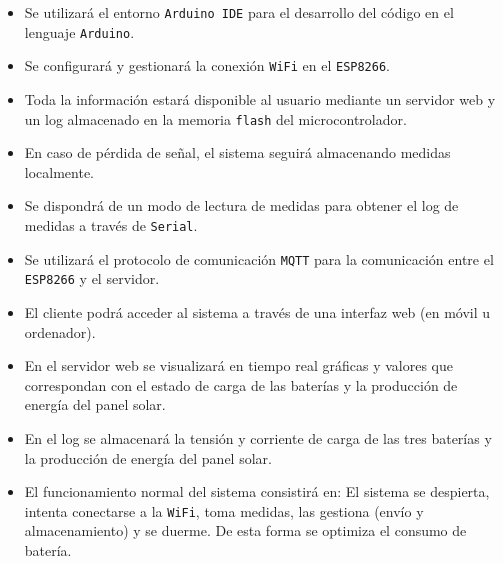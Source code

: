 \begin{itemize}
    \item Se utilizará el entorno \texttt{Arduino IDE} para el desarrollo del código en el lenguaje \texttt{Arduino}.
    \item Se configurará y gestionará la conexión \texttt{WiFi} en el \texttt{ESP8266}.
    \item Toda la información estará disponible al usuario mediante un servidor web y un log almacenado en la memoria \texttt{flash} del microcontrolador.
    \item En caso de pérdida de señal, el sistema seguirá almacenando medidas localmente.
    \item Se dispondrá de un modo de lectura de medidas para obtener el log de medidas a través de \texttt{Serial}.
    \item Se utilizará el protocolo de comunicación \texttt{MQTT} para la comunicación entre el \texttt{ESP8266} y el servidor.
    \item El cliente podrá acceder al sistema a través de una interfaz web (en móvil u ordenador).
    \item En el servidor web se visualizará en tiempo real gráficas y valores que correspondan con el estado de carga de las baterías y la producción de energía del panel solar.
    \item En el log se almacenará la tensión y corriente de carga de las tres baterías y la producción de energía del panel solar.
    \item El funcionamiento normal del sistema consistirá en: El sistema se despierta, intenta conectarse a la \texttt{WiFi}, toma medidas, las gestiona (envío y almacenamiento) y se duerme. De esta forma se optimiza el consumo de batería.
\end{itemize}
